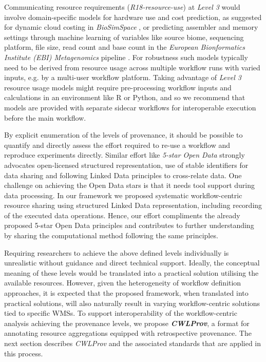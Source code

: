 \documentclass[a4paper,num-refs]{oup-contemporary}
\begin{document}
Communicating resource requirements (\textit{R18-resource-use}) at \textit{Level 3} would involve domain-specific models for hardware use and cost prediction, as suggested for dynamic cloud costing \citep{biosimspacewebinar} in \textit{BioSimSpace} \citep{biosimspace}, or predicting assembler and memory settings through machine learning of variables like source biome, sequencing platform, file size, read count and base count in the \textit{European Bionformatics Institute (EBI) Metagenomics} pipeline \citep{mitchell_2017}. For robustness such models typically need to be derived from resource usage across multiple workflow runs with varied inputs, e.g. by a multi-user workflow platform. Taking advantage of \textit{Level 3} resource usage models might require pre-processing workflow inputs and calculations in an environment like R or Python, and so we recommend that models are provided with separate sidecar workflows for interoperable execution before the main workflow.
 
By explicit enumeration of the levels of provenance, it should be possible to quantify and directly assess the effort required to re-use a workflow and reproduce experiments directly. Similar effort like \textit{5-star Open Data} \citep{5star} strongly advocates open-licensed structured representation, use of stable identifiers for data sharing and following Linked Data principles to cross-relate data. One challenge on achieving the Open Data stars is that it needs tool support during data processing. In our framework we proposed systematic workflow-centric resource sharing using structured Linked Data representation, including recording of the executed data operations. Hence, our effort compliments the already proposed 5-star Open Data principles and contributes to further understanding by sharing the computational method following the same principles. 

Requiring researchers to achieve the above defined levels individually is unrealistic without guidance and direct technical support. Ideally, the conceptual meaning of these levels would be translated into a practical solution utilising the available resources. However, given the heterogeneity of workflow definition approaches, it is expected that the proposed framework, when translated into practical solutions, will also naturally result in varying workflow-centric solutions tied to specific WMSs. To support interoperability of the workflow-centric analysis achieving the provenance levels, we propose \textbf{\textit{CWLProv}}, a format for annotating resource aggregations equipped with retrospective provenance. The next section describes \textit{CWLProv} and the associated standards that are applied in this process. 
\end{document}
